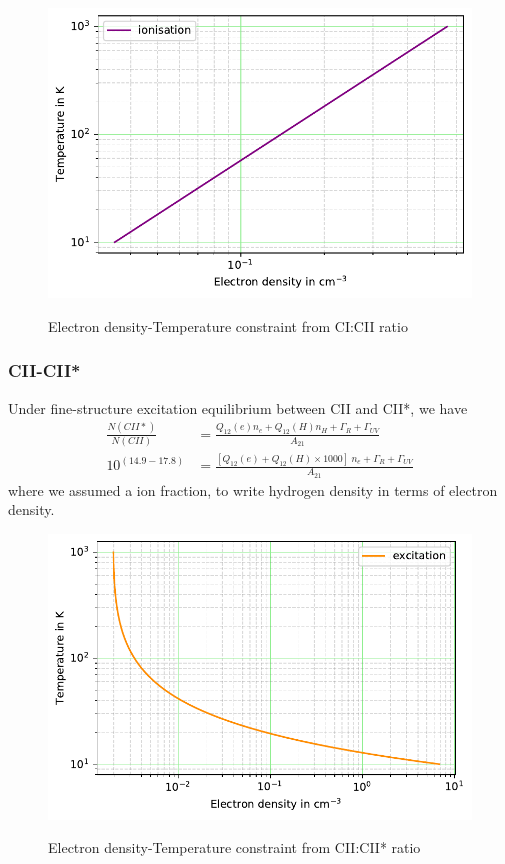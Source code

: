 \documentclass{jhwhw}
\begin{document}
\begin{figure}[H]
\centering
\caption{Electron density-Temperature constraint from CI:CII ratio}
\includegraphics[width=1\linewidth]{../prob-3-plot-1}
\label{fig:prob-3-plot-1}
\end{figure}

\subsubsection{CII-CII*}
Under fine-structure excitation equilibrium between CII and CII*, we have
\begin{align}
\frac{N(CII*)}{N(CII)} &= \frac{Q_{12}(e) n_e + Q_{12}(H) n_H + \Gamma_R + \Gamma_{UV}}{A_{21}}\\
10^{(14.9-17.8)} &=  \frac{[Q_{12}(e) + Q_{12}(H) \times 1000] ~n_e + \Gamma_R + \Gamma_{UV}}{A_{21}}
\end{align}
where we assumed a ion fraction, to write hydrogen density in terms of electron density. 
\begin{figure}[H]
	\centering
	\caption{Electron density-Temperature constraint from CII:CII* ratio}
	\includegraphics[width=1\linewidth]{../prob-3-plot-2}
	\label{fig:prob-3-plot-2}
\end{figure}
\end{document}
